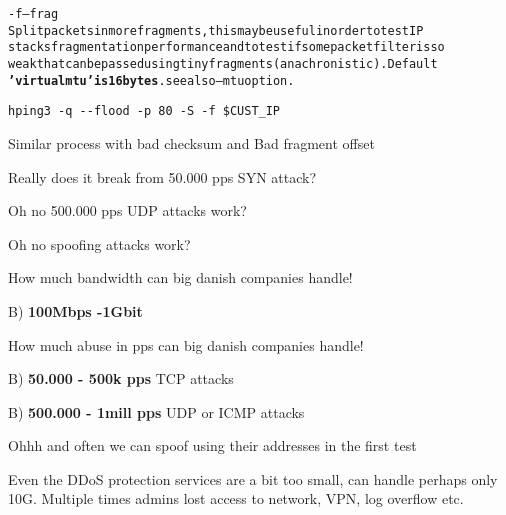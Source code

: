\documentclass[Screen16to9,17pt]{foils}
\begin{document}
\begin{alltt}\small
-f --frag
    Split  packets  in more fragments, this may be useful in order to test IP
    stacks fragmentation performance and to test if some packet filter is  so
    weak  that  can  be  passed using tiny fragments (anachronistic). Default
    {\bf 'virtual mtu' is 16 bytes}. see also --mtu option.
\end{alltt}

\begin{list1}
\item \verb+hping3 -q --flood -p 80 -S -f $CUST_IP+
\item Similar process with bad checksum and Bad fragment offset
\end{list1}



\centerline{Really does it break from 50.000 pps SYN attack?}



\centerline{Oh no 500.000 pps UDP attacks work?}


\centerline{Oh no spoofing attacks work?}






How much bandwidth can big danish companies handle!
\begin{list2}
\item B) {\bf 100Mbps -1Gbit}
\end{list2}

How much abuse in pps can big danish companies handle!
\begin{list2}
\item B) {\bf 50.000 - 500k pps} TCP attacks
\item B) {\bf 500.000 - 1mill pps} UDP or ICMP attacks
\item Ohhh and often we can spoof using their addresses in the first test
\end{list2}

Even the DDoS protection services are a bit too small, can handle perhaps only 10G. Multiple times admins lost access to network, VPN, log overflow etc.
\end{document}
